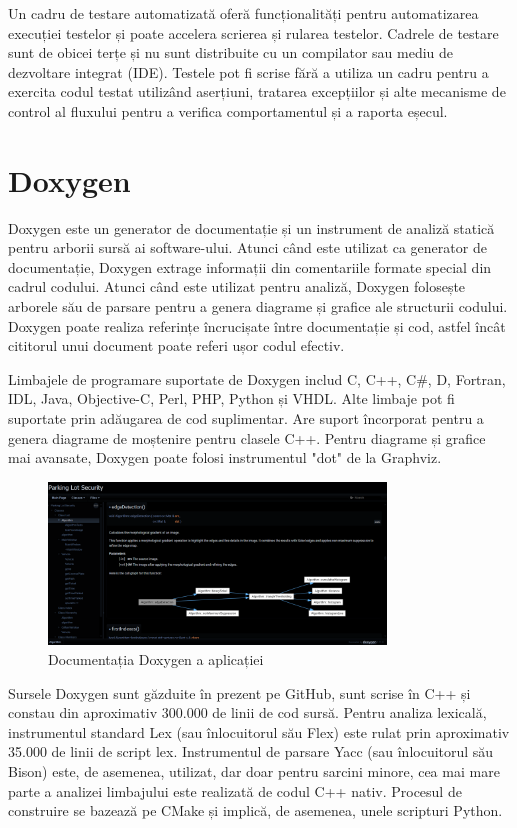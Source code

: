 \documentclass[a4paper,12pt]{report}
\begin{document}
Un cadru de testare automatizată oferă funcționalități pentru automatizarea execuției testelor și poate accelera scrierea și rularea testelor. Cadrele de testare sunt de obicei terțe și nu sunt distribuite cu un compilator sau mediu de dezvoltare integrat (IDE). Testele pot fi scrise fără a utiliza un cadru pentru a exercita codul testat utilizând aserțiuni, tratarea excepțiilor și alte mecanisme de control al fluxului pentru a verifica comportamentul și a raporta eșecul.

\section{Doxygen}
Doxygen este un generator de documentație și un instrument de analiză statică pentru arborii sursă ai software-ului. Atunci când este utilizat ca generator de documentație, Doxygen extrage informații din comentariile formate special din cadrul codului. Atunci când este utilizat pentru analiză, Doxygen folosește arborele său de parsare pentru a genera diagrame și grafice ale structurii codului. Doxygen poate realiza referințe încrucișate între documentație și cod, astfel încât cititorul unui document poate referi ușor codul efectiv.

Limbajele de programare suportate de Doxygen includ C, C++, C\#, D, Fortran, IDL, Java, Objective-C, Perl, PHP, Python și VHDL. Alte limbaje pot fi suportate prin adăugarea de cod suplimentar. Are suport încorporat pentru a genera diagrame de moștenire pentru clasele C++. Pentru diagrame și grafice mai avansate, Doxygen poate folosi instrumentul "dot" de la Graphviz.

\begin{figure}[h!]
    \centering
    \includegraphics[width=0.8\textwidth]{images/doxygen.jpg}
    \caption{Documentația Doxygen a aplicației}
\end{figure}
\FloatBarrier

Sursele Doxygen sunt găzduite în prezent pe GitHub, sunt scrise în C++ și constau din aproximativ 300.000 de linii de cod sursă. Pentru analiza lexicală, instrumentul standard Lex (sau înlocuitorul său Flex) este rulat prin aproximativ 35.000 de linii de script lex. Instrumentul de parsare Yacc (sau înlocuitorul său Bison) este, de asemenea, utilizat, dar doar pentru sarcini minore, cea mai mare parte a analizei limbajului este realizată de codul C++ nativ. Procesul de construire se bazează pe CMake și implică, de asemenea, unele scripturi Python.
\end{document}
